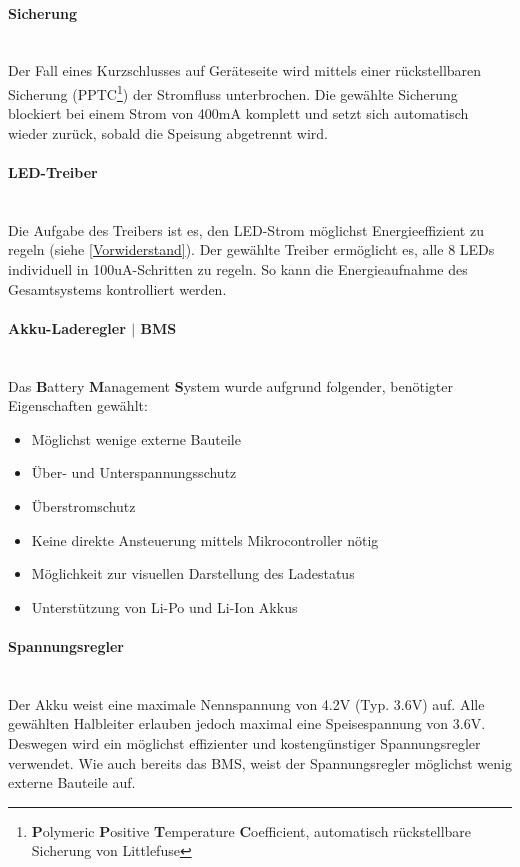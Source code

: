 \documentclass[12pt]{article}
\begin{document}
	\paragraph{Sicherung}\mbox{}\\
	Der Fall eines Kurzschlusses auf Geräteseite wird mittels einer rückstellbaren Sicherung (PPTC\footnote{\textbf{P}olymeric \textbf{P}ositive \textbf{T}emperature \textbf{C}oefficient, automatisch rückstellbare Sicherung von Littlefuse}) der Stromfluss unterbrochen. Die gewählte Sicherung blockiert bei einem Strom von 400mA komplett und setzt sich automatisch wieder zurück, sobald die Speisung abgetrennt wird.
	\paragraph{LED-Treiber} \mbox{}\\
	Die Aufgabe des Treibers ist es, den LED-Strom möglichst Energieeffizient zu regeln (siehe \ref{Vorwiderstand}). Der gewählte Treiber ermöglicht es, alle 8 LEDs individuell in 100uA-Schritten zu regeln. So kann die Energieaufnahme des Gesamtsystems kontrolliert werden.
	\paragraph{Akku-Laderegler $\vert$ BMS} \mbox{}\\
	Das \textbf{B}attery \textbf{M}anagement \textbf{S}ystem wurde aufgrund folgender, benötigter Eigenschaften gewählt:
	\begin{itemize}
		\item Möglichst wenige externe Bauteile
		\item Über- und Unterspannungsschutz
		\item Überstromschutz
		\item Keine direkte Ansteuerung mittels Mikrocontroller nötig
		\item Möglichkeit zur visuellen Darstellung des Ladestatus
		\item Unterstützung von Li-Po und Li-Ion Akkus
	\end{itemize}
	\paragraph{Spannungsregler} \mbox{}\\
	Der Akku weist eine maximale Nennspannung von 4.2V (Typ. 3.6V) auf. Alle gewählten Halbleiter erlauben jedoch maximal eine Speisespannung von 3.6V. Deswegen wird ein möglichst effizienter und kostengünstiger Spannungsregler verwendet. Wie auch bereits das BMS, weist der Spannungsregler möglichst wenig externe Bauteile auf.
\end{document}
